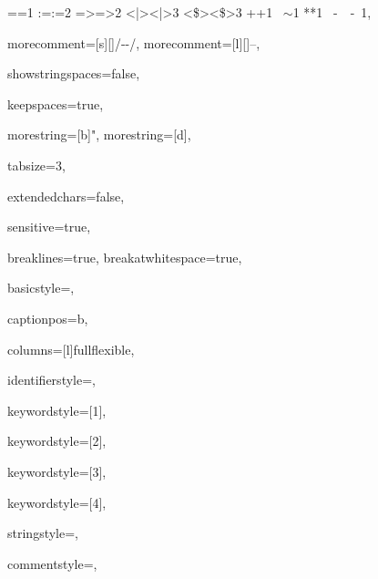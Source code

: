 {{=}{{\color{symbolcolor}=}}1
{:=}{{\color{symbolcolor}:=}}2
{=>}{{\color{symbolcolor}=>}}2
{<|>}{{\color{symbolcolor}<|>}}3
{<\$>}{{\color{symbolcolor}<\$>}}3
{+}{{\color{symbolcolor}+}}1
{~}{{\color{symbolcolor}\ensuremath{\sim}}}1
{*}{{\color{symbolcolor}*}}1
{\ -\ }{{\color{symbolcolor}\ -\ }}1,

morecomment=[s][\color{commentcolor}]{/-}{-/},
morecomment=[l][\color{commentcolor}]{--},

showstringspaces=false,

keepspaces=true,

morestring=[b]",
morestring=[d],

tabsize=3,

extendedchars=false,

sensitive=true,

breaklines=true,
breakatwhitespace=true,

basicstyle=\ttfamily,

captionpos=b,

columns=[l]fullflexible,

identifierstyle={\ttfamily\color{black}},

keywordstyle=[1]{\ttfamily\color{keywordcolor}},

keywordstyle=[2]{\ttfamily\color{sortcolor}},

keywordstyle=[3]{\ttfamily\color{tacticcolor}},

keywordstyle=[4]{\ttfamily\color{attributecolor}},

stringstyle=\ttfamily,

commentstyle={\ttfamily\upshape\footnotesize\color{gray}},

}
